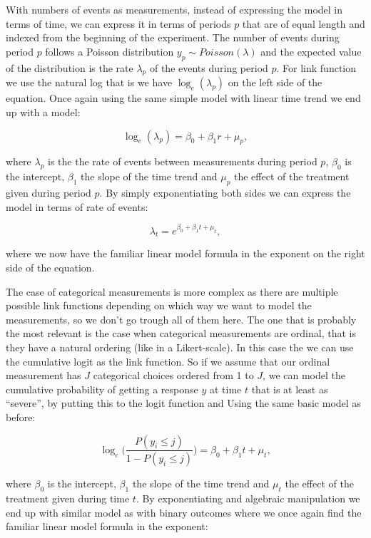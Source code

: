 \documentclass[12pt,a4paper,leqno]{report}
\theoremstyle{plain}
\theoremstyle{definition}
\theoremstyle{remark}
\begin{document}
With numbers of events as measurements, instead of expressing the model in terms of time, we can
express it in terms of periods \(p\) that are of equal length and indexed from the beginning of the experiment.
The number of events during period \(p\)
follows a Poisson distribution \(y_p \sim Poisson(\lambda)\)
and the expected value of the distribution is the rate \(\lambda_p \) of the events during period \(p\).
For link function we use the natural log
that is we have \(\log_e(\lambda_p)\) on the left side of the equation.
Once again using the same simple model with linear time trend we end up with a model:

\begin{def}\label{oneerror}
\begin{equation}
\log_e(\lambda_p)=\beta_0 + \beta_1 r + \mu_{p},
\end{equation}
\end{def}where \(\lambda_p\) is the the rate of events between measurements during period \(p\),
\(\beta_0\) is the intercept, \(\beta_1\) the slope of the time trend and \(\mu_p\) the
effect of the treatment given during period \(p\). By simply exponentiating both sides
we can express the model in terms of rate of events:

\begin{def}\label{oneerror}
\begin{equation}
\lambda_t=e^{\beta_0 + \beta_1 t + \mu_t},
\end{equation}
\end{def}where we now have the familiar linear model formula in the exponent on the right side of
the equation.

The case of categorical measurements is more complex as there are multiple possible link functions
depending on which way we want to model the measurements, so we don't go trough all of them here.
The one that is probably the most relevant is the case when categorical measurements
are ordinal, that is they have a natural ordering (like in a Likert-scale).
In this case the we can use the cumulative logit as the link function.
So if we assume that our ordinal measurement
has \(J\) categorical choices ordered from 1 to \(J\),
we can model the cumulative probability of getting a response \(y\) at time
\(t\) that is at least as ``severe'',
by putting this to the logit function and Using the same basic model as before:

\begin{def}\label{oneerror}
\begin{equation}
\log_e\bigg({\frac{P(y_i \leq j)}{1 - P(y_i \leq j)}}\bigg)=\beta_0 + \beta_1 t + \mu_t,
\end{equation}
\end{def}where \(\beta_0\) is the intercept, \(\beta_1\) the slope of the time trend and \(\mu_t\) the
effect of the treatment given during time \(t\). By exponentiating
and algebraic manipulation we end up with similar model as with binary outcomes
where we once again find the familiar linear model formula in the exponent:
\end{document}
